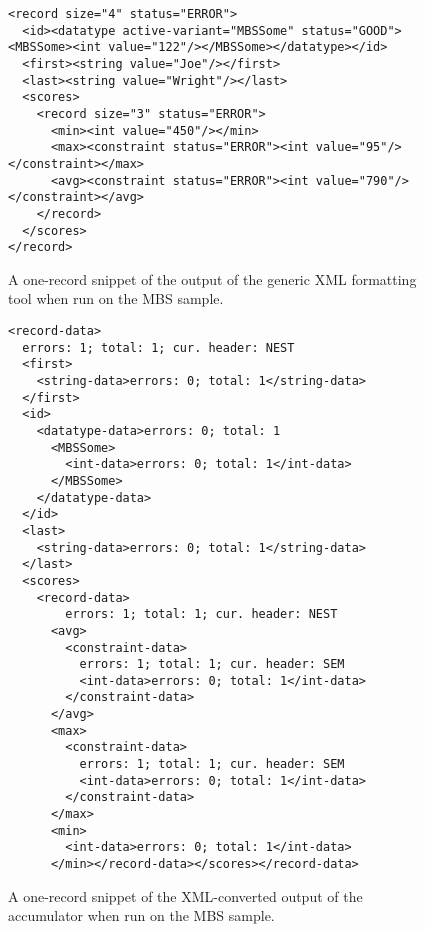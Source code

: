 \begin{figure*}
  \centering
  \small
\begin{verbatim}
<record size="4" status="ERROR">
  <id><datatype active-variant="MBSSome" status="GOOD"><MBSSome><int value="122"/></MBSSome></datatype></id>
  <first><string value="Joe"/></first>
  <last><string value="Wright"/></last>
  <scores>
  	<record size="3" status="ERROR">
      <min><int value="450"/></min>
      <max><constraint status="ERROR"><int value="95"/></constraint></max>
      <avg><constraint status="ERROR"><int value="790"/></constraint></avg>
    </record>
  </scores>
</record>
\end{verbatim}  
  \caption{A one-record snippet of the output of the generic XML formatting tool when run on the MBS sample.}
  \label{fig:gentool-xmlf-output}
\end{figure*}

\begin{figure}
  \centering
  \small
\begin{verbatim}
<record-data>
  errors: 1; total: 1; cur. header: NEST
  <first>
    <string-data>errors: 0; total: 1</string-data>
  </first>
  <id>
    <datatype-data>errors: 0; total: 1
      <MBSSome>
        <int-data>errors: 0; total: 1</int-data>
      </MBSSome>
    </datatype-data>
  </id>
  <last>
    <string-data>errors: 0; total: 1</string-data>
  </last>
  <scores>
    <record-data>
    	errors: 1; total: 1; cur. header: NEST
      <avg>
        <constraint-data>
          errors: 1; total: 1; cur. header: SEM
          <int-data>errors: 0; total: 1</int-data>
        </constraint-data>
      </avg>
      <max>
        <constraint-data>
          errors: 1; total: 1; cur. header: SEM
          <int-data>errors: 0; total: 1</int-data>
        </constraint-data>
      </max>
      <min>
        <int-data>errors: 0; total: 1</int-data>
      </min></record-data></scores></record-data>
\end{verbatim}  
  \caption{A one-record snippet of the XML-converted output of the accumulator when run on the MBS sample.}
  \label{fig:gentool-acc-output}
\end{figure}

